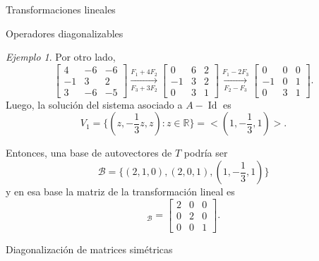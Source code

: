 \documentclass[a4paper,12pt,twoside,spanish,reqno]{amsbook}
\numberwithin{equation}{section}
\theoremstyle{definition}
\theoremstyle{remark}
\newtheorem*{ejemplo*}{Ejemplo}
\newcommand{\Id}{\operatorname{Id}}
\newcommand{\R}{\mathbb R}
\begin{document}
\begin{chapter}{Transformaciones lineales}
\begin{section}{Operadores diagonalizables}
\begin{ejemplo*}
            Por otro lado, 
            \begin{equation*}
            \begin{bmatrix}4 &-6 &-6\\ -1& 3& 2\\3 &-6& -5 	\end{bmatrix}
            \underset{F_3+3F_2}{\stackrel{F_1+4 F_2}{\longrightarrow}} 
            \begin{bmatrix}0 &6 &2\\ -1& 3& 2\\0 &3& 1 	\end{bmatrix}
            \underset{F_2-F_3}{\stackrel{F_1-2 F_3}{\longrightarrow}}
            \begin{bmatrix}0 &0 &0\\ -1& 0& 1\\0 &3& 1 	\end{bmatrix}.
            \end{equation*}
            Luego,  la solución del sistema asociado a  $A-\Id$ es 
            $$
            V_1 = \{(z,-\frac13z,z): z \in \R\} = <(1,-\frac13,1)>.
            $$
            
            Entonces, una base de autovectores de $T$ podría ser
            $$
            \mathcal{B} = \{(2,1,0),(2,0,1),(1,-\frac13,1) \}
            $$
            y en esa base la matriz de la transformación lineal es
            \begin{equation*}
            [T]_{\mathcal{B}} = \begin{bmatrix}2 &0 &0\\ 0& 2& 0\\0 &0& 1 	\end{bmatrix}.
            \end{equation*}
        \end{ejemplo*}
    
        
        \end{section}
    
    
        
    

\begin{section}{Diagonalización de matrices simétricas}\label{seccion-diagonalizacion-de-simetricas}
    

    
    

\end{section}
\end{chapter}
\end{document}
